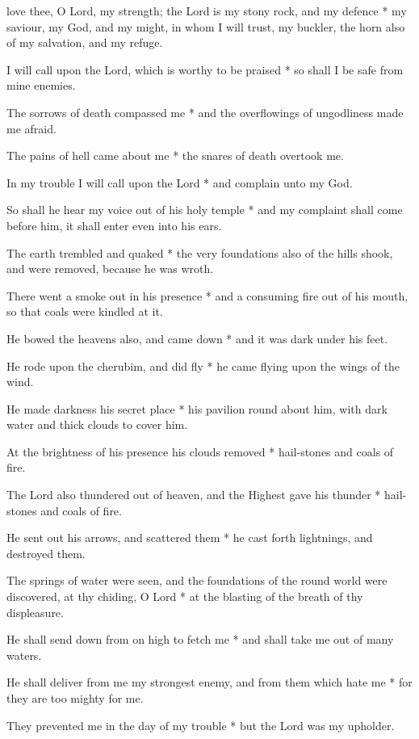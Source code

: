  love thee, O Lord, my strength; the Lord is my stony rock, and my defence * my saviour, my God, and my might, in whom I will trust, my buckler, the horn also of my salvation, and my refuge.

I will call upon the Lord, which is worthy to be praised * so shall I be safe from mine enemies.

The sorrows of death compassed me * and the overflowings of ungodliness made me afraid.

The pains of hell came about me * the snares of death overtook me.

In my trouble I will call upon the Lord * and complain unto my God.

So shall he hear my voice out of his holy temple * and my complaint shall come before him, it shall enter even into his ears.

The earth trembled and quaked * the very foundations also of the hills shook, and were removed, because he was wroth.

There went a smoke out in his presence * and a consuming fire out of his mouth, so that coals were kindled at it.

He bowed the heavens also, and came down * and it was dark under his feet.

He rode upon the cherubim, and did fly * he came flying upon the wings of the wind.

He made darkness his secret place * his pavilion round about him, with dark water and thick clouds to cover him.

At the brightness of his presence his clouds removed * hail-stones and coals of fire.

The Lord also thundered out of heaven, and the Highest gave his thunder * hail-stones and coals of fire.

He sent out his arrows, and scattered them * he cast forth lightnings, and destroyed them.

The springs of water were seen, and the foundations of the round world were discovered, at thy chiding, O Lord * at the blasting of the breath of thy displeasure.

He shall send down from on high to fetch me * and shall take me out of many waters.

He shall deliver from me my strongest enemy, and from them which hate me * for they are too mighty for me.

They prevented me in the day of my trouble * but the Lord was my upholder.

